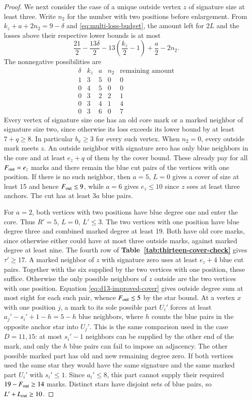 \documentclass[preprint,11pt,numbers]{elsarticle-arxiv}
\numberwithin{equation}{section}
\theoremstyle{definition}
\begin{document}
\begin{proof}
We next consider the case of a unique outside vertex $z$ of signature
size at least three. Write $n_2$ for the number with two positions
before enlargement. From $k_z+a+2n_2=9-\delta$ and
\eqref{eq:multi-loss-budget}, the amount left for $2L$ and the
losses above their respective lower bounds is at most
\[
 \frac{21}{2}-\frac{13\delta}{2}
 -13\left(\frac{k_z}{2}-1\right)+\frac{a}{2}-2n_2 .
\]
The nonnegative possibilities are
\[
\begin{array}{rrrrr}
 \delta& k_z&a&n_2&\text{remaining amount}\\
 1&3&5&0&0\\
 0&4&5&0&0\\
 0&3&2&2&1\\
 0&3&4&1&4\\
 0&3&6&0&7
\end{array}
\]
Every vertex of signature size one has an old core mark or a marked
neighbor of signature size two, since otherwise its loss exceeds its
lower bound by at least $7+q\ge8$. In particular $b_x\ge3$ for
every such vertex. When $n_2=0$, every outside mark meets $z$.
An outside neighbor with signature zero has only blue neighbors in
the core and at least $e_z+q$ of them by the cover bound. These
already pay for all $F_{\rm out}=e_z$ marks and there remain the
blue cut pairs of the vertices with one position. If there is
no such neighbor, then $a=5$, $L=0$ gives a cover of size at least
15 and hence $F_{\rm out}\le9$, while $a=6$ gives $e_z\le10$ since
$z$ sees at least three anchors. The cut has at least $3a$ blue pairs.

For $a=2$, both vertices with two positions have blue degree one
and enter the core. Thus $R'=5$, $L=0$, $L'\le3$. The two vertices
with one position have blue degree three and combined marked degree at
least 19. Both have old core marks, since otherwise either could have
at most three outside marks, against marked degree at least nine.
The fourth row of \textbf{Table~\ref{tab:thirteen-cover-check}} gives $\tau'\ge17$. A marked
neighbor of $z$ with signature zero uses at least $e_z+4$ blue
cut pairs. Together with the six supplied by the two vertices with
one position, these suffice. Otherwise the only possible neighbors
of $z$ outside are the two vertices with one position.
Equation \eqref{eq:d13-improved-cover} gives outside degree sum at
most eight for each such pair, whence $F_{\rm out}\le5$ by the star
bound. At a vertex $x$ with one position $j$, a mark to its sole
possible part $U_i'$ forces at least
$a_j'-s_i'+1-h=5-h$ blue neighbors, where $h$ counts the blue pairs
in the opposite anchor star into $U_j'$. This is the same comparison
used in the case $D=11,15$: at most $s_i'-1$ neighbors can be
supplied by the other end of the mark, and only the $h$ blue
pairs can fail to impose an adjacency. The other possible marked
part has old and new remaining degree zero. If both vertices used
the same star they would have the same signature and the same marked
part $U_i'$ with $s_i'\le1$. Since $a_i'\le8$, this part cannot
supply their required $19-F_{\rm out}\ge14$ marks. Distinct stars
have disjoint sets of blue pairs, so $L'+L_{\rm cut}\ge10$.


\end{proof}
\end{document}
